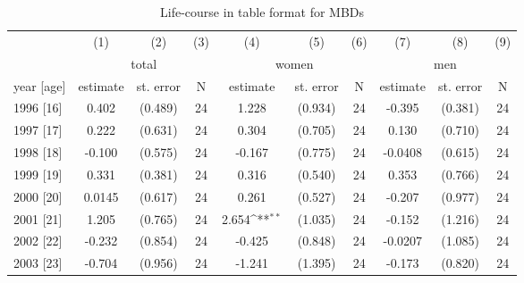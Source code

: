 \begin{table}[H] \centering 
	\begin{threeparttable} \centering \caption{Life-course in table format for MBDs}\label{rev_mlch: lc_table_d5}
		{\def\sym#1{\ifmmode^{#1}\else\(^{#1}\)\fi} 
			\begin{tabular}{l*{9}{c}}
				\toprule 
				&\multicolumn{1}{c}{(1)}&\multicolumn{1}{c}{(2)}&\multicolumn{1}{c}{(3)}&\multicolumn{1}{c}{(4)}&\multicolumn{1}{c}{(5)}&\multicolumn{1}{c}{(6)}&\multicolumn{1}{c}{(7)}&\multicolumn{1}{c}{(8)}&\multicolumn{1}{c}{(9)}\\
				& \multicolumn{3}{c}{total} & \multicolumn{3}{c}{women} & \multicolumn{3}{c}{men} \\ 
				\cmidrule(lr){2-4}\cmidrule(lr){5-7}\cmidrule(lr){8-10}
				\multicolumn{1}{c}{year [age]}&\multicolumn{1}{c}{estimate}&\multicolumn{1}{c}{st. error}&\multicolumn{1}{c}{N}&\multicolumn{1}{c}{estimate}&\multicolumn{1}{c}{st. error}&\multicolumn{1}{c}{N}&\multicolumn{1}{c}{estimate}&\multicolumn{1}{c}{st. error}&\multicolumn{1}{c}{N}\\
				\midrule
				1996 [16]	&       0.402         &     (0.489) &	24	&       1.228         &     (0.934)	& 24	&      -0.395         &     (0.381)	& 24	\\
				1997 [17]	&       0.222         &     (0.631) &	24	&       0.304         &     (0.705)	& 24	&       0.130         &     (0.710)	& 24	\\
				1998 [18]	&      -0.100         &     (0.575) &	24	&      -0.167         &     (0.775)	& 24	&     -0.0408         &     (0.615)	& 24	\\
				1999 [19]	&       0.331         &     (0.381) &	24	&       0.316         &     (0.540)	& 24	&       0.353         &     (0.766)	& 24	\\
				2000 [20]	&      0.0145         &     (0.617) &	24	&       0.261         &     (0.527)	& 24	&      -0.207         &     (0.977)	& 24	\\
				2001 [21]	&       1.205         &     (0.765) &	24	&       2.654\sym{**} &     (1.035)	& 24	&      -0.152         &     (1.216)	& 24	\\
				2002 [22]	&      -0.232         &     (0.854) &	24	&      -0.425         &     (0.848)	& 24	&     -0.0207         &     (1.085)	& 24	\\
				2003 [23]	&      -0.704         &     (0.956) &	24	&      -1.241         &     (1.395)	& 24	&      -0.173         &     (0.820)	& 24	\\

\end{tabular}}
\end{threeparttable}
\end{table}

